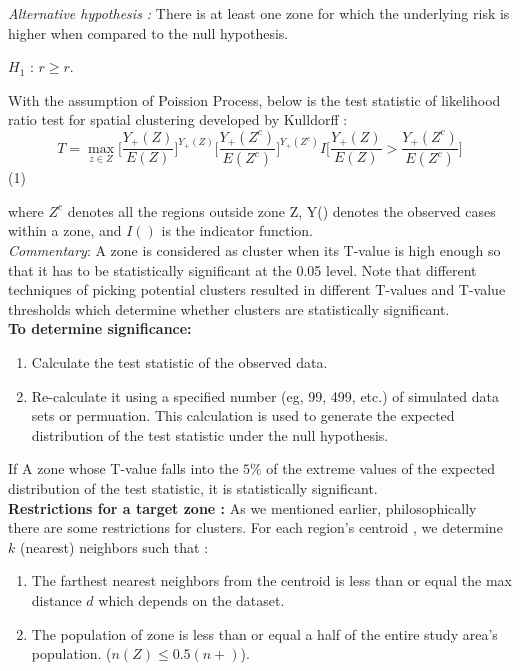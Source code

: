 \documentclass[12pt]{article}
\begin{document}
			
			\textit{Alternative hypothesis :} There is at least one zone for which the underlying risk is higher when compared to the null hypothesis. \\
 			\begin{center}
			$H_1$ : $r \geq r$. \\
			\end{center}	
			With the assumption of Poission Process, below is the test statistic of likelihood ratio test for spatial clustering developed by Kulldorff : \\
				\[
					T = \max_{z\in Z} \bigg[\dfrac{Y_+(Z)}{E(Z)}\bigg]^{Y_+(Z)} \bigg[\dfrac{Y_+(Z^c)}{E(Z^c)}\bigg]^{Y_+(Z^c)} I\bigg[\dfrac{Y_+(Z)}{E(Z)} > \dfrac{Y_+(Z^c)}{E(Z^c)}\bigg]
				\]	  (1)
		
				where $ Z^c$ denotes all the regions outside zone Z, Y() denotes the observed cases within a zone, and $I()$ is the indicator function. \\ 
			
			 \textit{Commentary}: A zone is considered as cluster when its T-value is high enough so that it has to be statistically significant at the 0.05 level. Note that different techniques of picking potential clusters resulted in different T-values and T-value thresholds which determine whether clusters are statistically significant. \\
			 
			 \textbf{To determine significance:} \\
			 \begin{enumerate}
			 \item Calculate the test statistic of the observed data.	
			 \item Re-calculate it using a specified number (eg, 99, 499, etc.) of simulated data sets or permuation. This calculation is used to generate the expected distribution of the test statistic under the null hypothesis. 
			 \end{enumerate}
			 If A zone whose T-value falls into the $5\%$ of the extreme values of the expected distribution of the test statistic, it is statistically significant. \\
			
			\textbf{Restrictions for a target zone : } As we mentioned earlier, philosophically there are some restrictions for clusters. For each region's centroid , we determine $k$ (nearest) neighbors such that : \\
				\begin{enumerate}
					\item The farthest nearest neighbors from the centroid is less than or equal the max distance $d$ which depends on the dataset. \\ 
					\item The population of zone is less than or equal a half of the entire study area's population. ($n(Z) \leq 0.5(n+)$).\\
				\end{enumerate}
			
\end{document}
